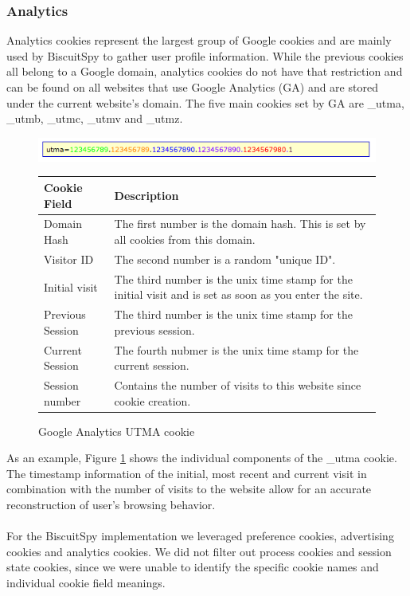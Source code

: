 \subsubsection{Analytics}
Analytics cookies represent the largest group of Google cookies and are mainly used by BiscuitSpy to gather user profile information. While the previous cookies all belong to a Google domain, analytics cookies do not have that restriction and can be found on all websites that use Google Analytics (GA) and are stored under the current website's domain. The five main cookies set by GA are  \_utma,  \_utmb, \_utmc, \_utmv and \_utmz. 

\begin{figure}[h]
\centering
\includegraphics[scale=0.8]{./diagrams/utma.png}

\begin{tabular}{ | l | p{12cm} |}
    \hline
  Cookie Field & Description \\ \hline
Domain Hash & The first number is the domain hash. This is set by all cookies from this domain. \\ \hline
Visitor ID & The second number is a random "unique ID". \\ \hline
Initial visit & The third number is the unix time stamp for the initial visit and is set as soon as you enter the site. \\ \hline
Previous Session & The third number is the unix time stamp for the previous session. \\ \hline
Current Session & The fourth nubmer is the unix time stamp for the current session. \\ \hline
Session number & Contains the number of visits to this website since cookie creation. \\ \hline
 \end{tabular}

\caption{Google Analytics UTMA cookie}
\label{fig:utma}

\end{figure}

As an example, Figure \ref{fig:utma} shows the individual components of the \_utma cookie. The timestamp information of the initial, most recent and current visit in combination with the number of visits to the website allow for an accurate reconstruction of user's browsing behavior. 
\\
\\
For the BiscuitSpy implementation we leveraged preference cookies, advertising cookies and analytics cookies. We did not filter out process cookies and session state cookies, since we were unable to identify the specific cookie names and individual cookie field meanings.


